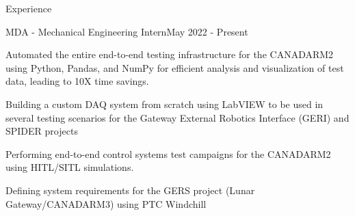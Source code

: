 \documentclass{resume} %
\begin{document}

\begin{rSection}{Experience}

\begin{rSubsection}{MDA - Mechanical Engineering Intern}{May 2022 - Present}{}{}

\item Automated the entire end-to-end testing infrastructure for the CANADARM2 using Python, Pandas, and NumPy for efficient analysis and visualization of test data, leading to 10X time savings.
\item Building a custom DAQ system from scratch using LabVIEW to be used in several testing scenarios for the Gateway External Robotics Interface (GERI) and SPIDER projects
\item Performing end-to-end control systems test campaigns for the CANADARM2 using HITL/SITL simulations.
\item Defining system requirements for the GERS project (Lunar Gateway/CANADARM3) using PTC Windchill

\end{rSubsection}

\begin{comment}

\begin{rSubsection}{Co-Lead Propulsion Engineer}{September 2022 - Present}{Queen's Rocket Engineering Team}{}
\item Designing the team's first 3D-printed Hybrid Rocket Engine to compete in the SA Cup 10,000ft SRAD category
\item Writing a Python simulation to numerically model the complex behaviour of a hybrid rocket engine, allowing for the prediction and optimization of performance metrics such as thrust, chamber pressure, and specific impulse.
\item 
\item Managing a team of over 50 engineers to accomplish a hot-fire test through efficiently delegating tasks, providing learning resources, and 
\item Created Standard Operating Procedures (SOP) documentation in LaTeX for the safe operation of a cold-flow and hot-fire test, complete with hazard assessment, risk mitigation, and contingency planning

\end{rSubsection}


\end{comment}
\end{rSection}
\end{document}
